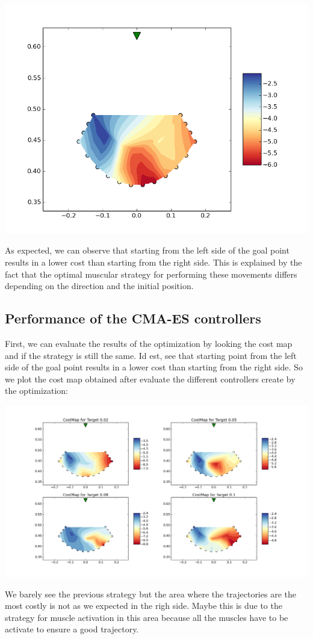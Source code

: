 \documentclass[pdftex,a4paper,11pt]{report}
\begin{document}
\begin{center}
\includegraphics[scale=0.5]{figures/costMapRBFNShuffle1.png}
\end{center}
As expected, we can observe that starting from the left side of the goal point results in a lower cost than starting from the right side. This is explained by the fact that the optimal muscular strategy for performing these movements differs depending on the direction and the initial position.

\subsection{Performance of the CMA-ES controllers}
First, we can evaluate the results of the optimization by looking the cost map and if the strategy is still the same. Id est, see that starting point from the left side of the goal point results in a lower cost than starting from the right side.
So we plot the cost map obtained after evaluate the different controllers create by the optimization:
\begin{center}
\includegraphics[scale=0.3]{figures/costMapAll.png}
\end{center}
We barely see the previous strategy but the area where the trajectories are the most costly is not as we expected in the righ side.
Maybe this is due to the strategy for muscle activation in this area because all the muscles have to be activate to ensure a good trajectory.
\end{document}
